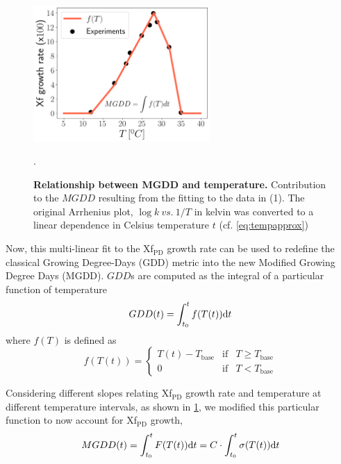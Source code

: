 \begin{figure}[H]
    \centering
    \includegraphics[width=0.6\textwidth]{Figures/Climatic_layer_1.png}
    \caption[Relationship between MGDD and temperature]{\textbf{Relationship
            between MGDD and temperature.}
        Contribution to the $MGDD$ resulting from the fitting to the data in
        (1). The
        original Arrhenius plot, $\log{k} \ vs. \ 1/T$ in kelvin was converted
        to
        a linear dependence in Celsius temperature $t$ (cf.
        \cref{eq:tempapprox})}.
    \label{figS2} %
\end{figure}

Now, this multi-linear fit to the Xf$_{\textrm{PD}}$ growth rate can be
used to redefine the classical Growing Degree-Days (GDD) metric into the new
Modified Growing Degree Days (MGDD). $GDD$s are computed as the integral of a
particular function of temperature
\begin{equation}
    GDD(t)=\int_{t_0}^tf(T(t))\mathrm{d} t
\end{equation}
where $f(T)$ is defined as
\begin{equation}
    f(T(t))=\left\{\begin{array}{ccc}
        T(t) - T_{\textrm{base}} & \textrm{if} & T\geq T_{\textrm{base}} \\
        0                        & \textrm{if} & T < T_{\textrm{base}}
    \end{array} \right.
\end{equation}

Considering different slopes relating Xf$_{\textrm{PD}}$ growth rate and
temperature at different temperature intervals, as shown in \cref{figS2}, we
modified this particular function to now account for Xf$_{\textrm{PD}}$ growth,
\begin{equation}\label{eq:MGDD_t}
    MGDD(t)=\int_{t_0}^tF(T(t))\mathrm{d} t=C\cdot\int_{t_0}^t\sigma(T(t))\mathrm{d} t
\end{equation}

